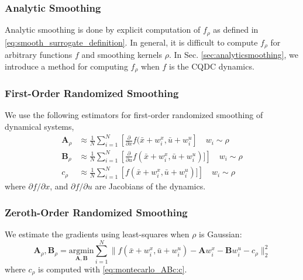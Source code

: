 \subsubsection{Analytic Smoothing}
Analytic smoothing is done by explicit computation of $f_\rho$ as defined in \eqref{eq:smooth_surrogate_definition}. In general, it is difficult to compute $f_\rho$ for arbitrary functions $f$ and smoothing kernels $\rho$. In Sec. \ref{sec:analyticsmoothing}, we introduce a method for computing $f_\rho$ when $f$ is the CQDC dynamics.

\subsubsection{First-Order Randomized Smoothing}
We use the following estimators for first-order randomized smoothing of dynamical systems,
\begin{subequations}
\label{eq:montecarlo_ABc}
\begin{align}
\mathbf{A}_\rho & \approx \textstyle \frac{1}{N}\sum^N_{i=1} \left[\textstyle\frac{\partial}{\partial x}f(\bar{x}+w_i^x,\bar{u}+w_i^u\right] \quad w_i\sim \rho \label{eq:montecarlo_ABc:A} \\ 
\mathbf{B}_\rho & \approx \textstyle \frac{1}{N}\sum^N_{i=1} \left[\textstyle\frac{\partial}{\partial u}f(\bar{x}+w_i^x,\bar{u}+w_i^u)]\right] \quad w_i\sim \rho \\ 
c_\rho & \approx \textstyle \frac{1}{N}\sum^N_{i=1} \left[\textstyle f(\bar{x}+w_i^x,\bar{u}+w_i^u)]\right] \quad w_i\sim \rho \label{eq:montecarlo_ABc:c} 
\end{align}
\end{subequations}
where $\partial f/\partial x$, and $\partial f/\partial u$ are Jacobians of the dynamics.

\subsubsection{Zeroth-Order Randomized Smoothing}
We estimate the gradients using least-squares when $\rho$ is Gaussian:
\begin{equation}
\label{eq:montecarlo_ABc_zero}
\mathbf{A}_\rho,\mathbf{B}_\rho  = \underset{\mathbf{A,B}} {\text{argmin}}\textstyle\sum^N_{i=1}
 \| f(\bar{x}+w_i^x,\bar{u}+w_i^u) - \mathbf{A} w_i^x - \mathbf{B} w_i^u - c_\rho\|^2_2
\end{equation}
where $c_\rho$ is computed with \eqref{eq:montecarlo_ABc:c}.


